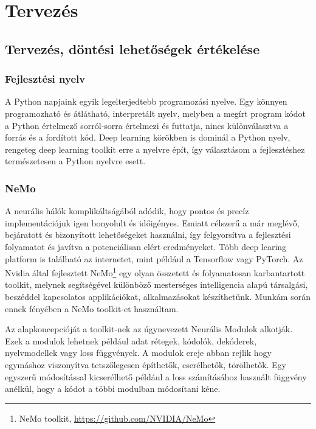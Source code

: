 \chapter{Tervezés}

\section{Tervezés, döntési lehetőségek értékelése}

\subsection{Fejlesztési nyelv}

A Python napjaink egyik legelterjedtebb programozási nyelve. Egy könnyen programozható és átlátható, interpretált nyelv, melyben a megírt program kódot a Python értelmező sorról-sorra értelmezi és futtatja, nincs különválasztva a forrás és a fordított kód. Deep learning körökben is dominál a Python nyelv, rengeteg deep learning toolkit erre a nyelvre épít, így választásom a fejlesztéshez természetesen a Python nyelvre esett.

\subsection{NeMo}

A neurális hálók komplikáltságából adódik, hogy pontos és precíz implementációjuk igen bonyolult és időigényes. Emiatt célszerű a már meglévő, bejáratott és bizonyított lehetőségeket használni, így felgyorsítva a fejlesztési folyamatot és javítva a potenciálisan elért eredményeket. Több deep learing platform is található az internetet, mint például a Tensorflow vagy PyTorch. Az Nvidia által fejlesztett NeMo\footnote{NeMo toolkit, \url{https://github.com/NVIDIA/NeMo}} egy olyan összetett és folyamatosan karbantartott toolkit, melynek segítségével különböző mesterséges intelligencia alapú társalgási, beszéddel kapcsolatos applikációkat, alkalmazásokat készíthetünk. Munkám során ennek fényében a NeMo toolkit-et használtam.

Az alapkoncepcióját a toolkit-nek az úgynevezett Neurális Modulok alkotják. Ezek a modulok lehetnek például adat rétegek, kódolók, dekóderek, nyelvmodellek vagy loss függvények. A modulok ereje abban rejlik hogy egymáshoz viszonyítva tetszőlegesen építhetők, cserélhetők, törölhetők. Egy egyszerű módosítással kicserélhető például a loss számításához használt függvény anélkül, hogy a kódot a többi modulban módosítani kéne.

